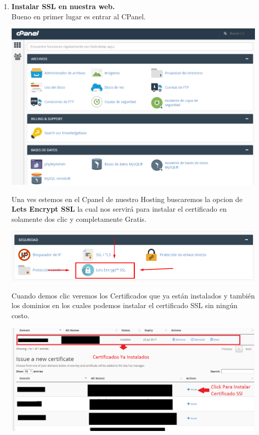 			\begin{enumerate}
		
		
		\item \textbf{Instalar SSL en nuestra web.}\\
		
		Bueno en primer lugar es entrar al CPanel.
			
		\begin{center}
		\includegraphics[scale=0.3]{image/image1.png}\\
		\end{center}
		
		Una ves estemos en el Cpanel de nuestro Hosting buscaremos la opcion de \textbf{Lets Encrypt SSL}  la cual nos servirá para instalar el certificado en solamente dos clic  y completamente Gratis.
		
		\begin{center}
		\includegraphics[scale=0.32]{image/image2.png}\\
		\end{center}
			\newpage
			
			Cuando demos clic veremos los Certificados que ya están instalados y también los dominios en los cuales podemos instalar el certificado SSL sin ningún costo.
			
		\begin{center}
		\includegraphics[scale=0.23]{image/image3.png}\\
		\end{center}
		

\end{enumerate}
